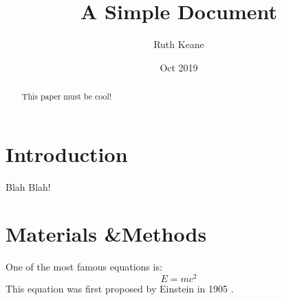 \documentclass[12pt]{article}
\title{A Simple Document}
\author{Ruth Keane}
\date{Oct 2019}
\begin{document}
    \maketitle

    \begin{abstract}
        This paper must be cool!
    \end{abstract}
    \section{Introduction}
    Blah Blah!
    \section{Materials \&Methods}
    One of the most famous equations is:
    \begin{equation}
     E=mc^2
     \end{equation}
     This equation was first proposed by Einstein in 1905
     \cite{einstein1905does}.

     
     
\end{document}
